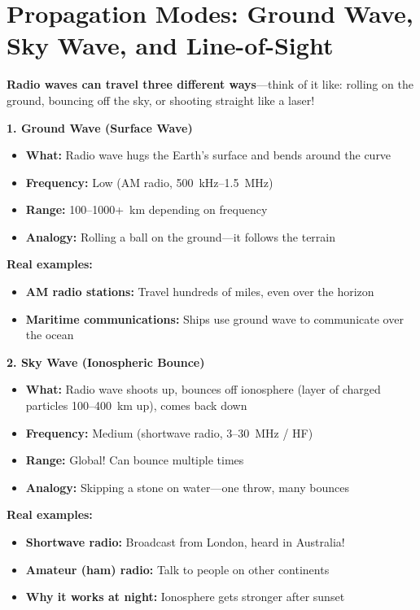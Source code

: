 \chapter{Propagation Modes: Ground Wave, Sky Wave, and Line-of-Sight}
\label{ch:propagation-modes}

\begin{nontechnical}
\textbf{Radio waves can travel three different ways}---think of it like: rolling on the ground, bouncing off the sky, or shooting straight like a laser!

\textbf{1. Ground Wave (Surface Wave)}
\begin{itemize}
\item \textbf{What:} Radio wave hugs the Earth's surface and bends around the curve
\item \textbf{Frequency:} Low (AM radio, 500~kHz--1.5~MHz)
\item \textbf{Range:} 100--1000+~km depending on frequency
\item \textbf{Analogy:} Rolling a ball on the ground---it follows the terrain
\end{itemize}

\textbf{Real examples:}
\begin{itemize}
\item \textbf{AM radio stations:} Travel hundreds of miles, even over the horizon
\item \textbf{Maritime communications:} Ships use ground wave to communicate over the ocean
\end{itemize}

\textbf{2. Sky Wave (Ionospheric Bounce)}
\begin{itemize}
\item \textbf{What:} Radio wave shoots up, bounces off ionosphere (layer of charged particles 100--400~km up), comes back down
\item \textbf{Frequency:} Medium (shortwave radio, 3--30~MHz / HF)
\item \textbf{Range:} Global! Can bounce multiple times
\item \textbf{Analogy:} Skipping a stone on water---one throw, many bounces
\end{itemize}

\textbf{Real examples:}
\begin{itemize}
\item \textbf{Shortwave radio:} Broadcast from London, heard in Australia!
\item \textbf{Amateur (ham) radio:} Talk to people on other continents
\item \textbf{Why it works at night:} Ionosphere gets stronger after sunset
\end{itemize}


\end{nontechnical}
